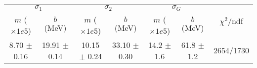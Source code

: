 \begin{tabular}{cc|cc|cc||c}
\multicolumn{2}{c|}{$\sigma_1$} & \multicolumn{2}{|c}{$\sigma_2$} & \multicolumn{2}{|c}{$\sigma_G$}  & \multirow{2}{*}{$\chi^2/$ndf}\\
$m$ ($\times1e5$) & $b$ (MeV) & $m$ ($\times1e5$) & $b$ (MeV) & $m$ ($\times1e5$) & $b$ (MeV) & \\
\hline
8.70 $\pm$ 0.16 & 19.91 $\pm$ 0.14 & 10.15 $\pm$ 0.24 & 33.10 $\pm$ 0.30 & 14.2 $\pm$ 1.6 & 61.8 $\pm$ 1.2 & 2654/1730\\
\end{tabular}
